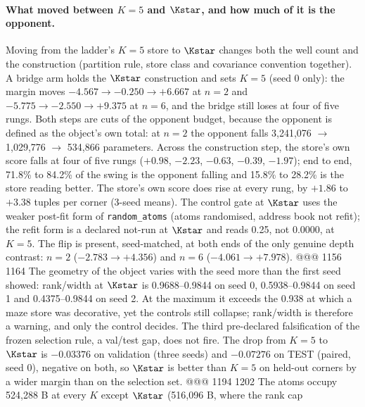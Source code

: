 \paragraph{What moved between $K=5$ and $\Kstar$, and how much of it is the opponent.} Moving
from the ladder's $K=5$ store to $\Kstar$ changes both the well count and the construction
(partition rule, store class and covariance convention together). A bridge arm holds the
$\Kstar$ construction and sets $K=5$ (seed 0 only): the margin moves $-4.567\to-0.250\to+6.667$
at $n=2$ and $-5.775\to-2.550\to+9.375$ at $n=6$, and the bridge still loses at four of five
rungs. %
Both steps are cuts of the opponent budget, because the opponent is defined as the object's own
total: at $n=2$ the opponent falls 3,241,076 $\to$ 1,029,776 $\to$ 534,866 parameters. Across the
construction step, the store's own score falls at four of five rungs ($+0.98$, $-2.23$, $-0.63$,
$-0.39$, $-1.97$); end to end, 71.8\% to 84.2\% of the swing is the opponent falling and 15.8\%
to 28.2\% is the store reading better. %
The store's own score does rise at every rung, by $+1.86$ to $+3.38$ tuples per corner (3-seed
means). %
The control gate at $\Kstar$ uses the weaker post-fit form of \texttt{random\_atoms} (atoms
randomised, address book not refit); the refit form is a declared not-run at $\Kstar$ and reads
0.25, not 0.0000, at $K=5$. %
The flip is present, seed-matched, at both ends of the only genuine depth contrast: $n=2$
($-2.783\to+4.356$) and $n=6$ ($-4.061\to+7.978$). %
@@@ 1156 1164
The geometry of the object varies with the seed more than the first seed showed:
rank/width at $\Kstar$ is 0.9688--0.9844 on seed 0, 0.5938--0.9844 on seed 1 and
0.4375--0.9844 on seed 2. At the maximum it exceeds the 0.938 at which a maze store was
decorative, yet the controls still collapse; rank/width is therefore a warning, and only the
control decides. %
The third pre-declared falsification of the frozen selection rule, a val/test gap, does not fire.
The drop from $K=5$ to $\Kstar$ is $-0.03376$ on validation (three seeds) and $-0.07276$ on
TEST (paired, seed 0), negative on both, so $\Kstar$ is better than $K=5$ on held-out corners
by a wider margin than on the selection set. %
@@@ 1194 1202
\noindent The atoms occupy 524,288 B at every $K$ except $\Kstar$ (516,096 B, where the rank cap
